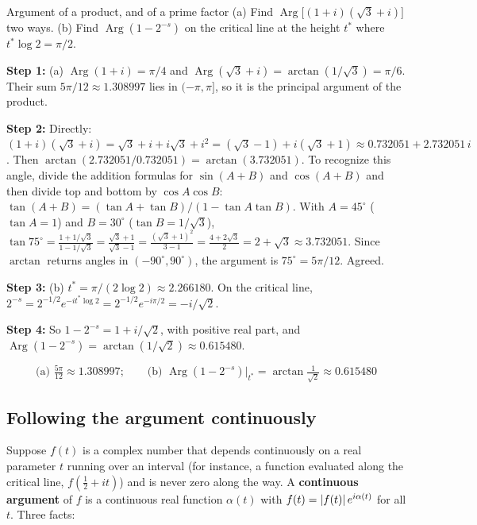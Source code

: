 \begin{sample}{Argument of a product, and of a prime factor}
(a) Find $\operatorname{Arg}\bigl[(1+i)(\sqrt3+i)\bigr]$ two ways. (b) Find $\operatorname{Arg}(1-2^{-s})$ on the critical line at the height $t^*$ where $t^*\log2=\pi/2$.

\textbf{Step 1:} (a) $\operatorname{Arg}(1+i)=\pi/4$ and $\operatorname{Arg}(\sqrt3+i)=\arctan(1/\sqrt3)=\pi/6$. Their sum $5\pi/12\approx1.308997$ lies in $(-\pi,\pi]$, so it is the principal argument of the product.

\textbf{Step 2:} Directly: $(1+i)(\sqrt3+i)=\sqrt3+i+i\sqrt3+i^2=(\sqrt3-1)+i(\sqrt3+1)\approx0.732051+2.732051\,i$. Then $\arctan(2.732051/0.732051)=\arctan(3.732051)$. To recognize this angle, divide the addition formulas for $\sin(A+B)$ and $\cos(A+B)$ and then divide top and bottom by $\cos A\cos B$: $\tan(A+B)=(\tan A+\tan B)/(1-\tan A\tan B)$. With $A=45^\circ$ ($\tan A=1$) and $B=30^\circ$ ($\tan B=1/\sqrt3$), $\tan75^\circ=\frac{1+1/\sqrt3}{1-1/\sqrt3}=\frac{\sqrt3+1}{\sqrt3-1}=\frac{(\sqrt3+1)^2}{3-1}=\frac{4+2\sqrt3}{2}=2+\sqrt3\approx3.732051$. Since $\arctan$ returns angles in $(-90^\circ,90^\circ)$, the argument is $75^\circ=5\pi/12$. Agreed.

\textbf{Step 3:} (b) $t^*=\pi/(2\log2)\approx2.266180$. On the critical line, $2^{-s}=2^{-1/2}e^{-it^*\log2}=2^{-1/2}e^{-i\pi/2}=-i/\sqrt2$.

\textbf{Step 4:} So $1-2^{-s}=1+i/\sqrt2$, with positive real part, and $\operatorname{Arg}(1-2^{-s})=\arctan(1/\sqrt2)\approx0.615480$.

\[
\boxed{\text{(a) }\tfrac{5\pi}{12}\approx1.308997;\qquad\text{(b) }\operatorname{Arg}(1-2^{-s})\big|_{t^*}=\arctan\tfrac1{\sqrt2}\approx0.615480}
\]
\end{sample}

\subsection{Following the argument continuously}

Suppose $f(t)$ is a complex number that depends continuously on a real parameter $t$ running over an interval (for instance, a function evaluated along the critical line, $f(\tfrac12+it)$) and is never zero along the way. A \textbf{continuous argument} of $f$ is a continuous real function $\alpha(t)$ with $f(t)=\left\lvert f(t)\right\rvert e^{i\alpha(t)}$ for all $t$. Three facts:

